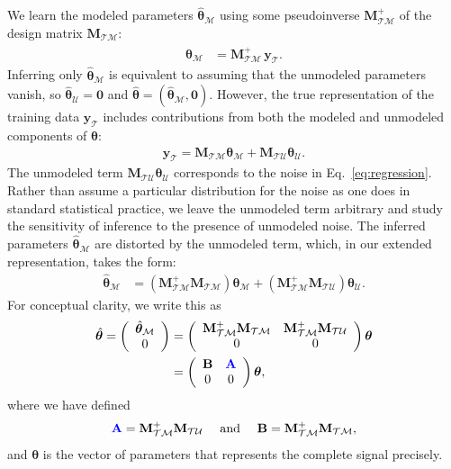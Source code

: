 \documentclass[twocolumn,aps,prx,superscriptaddress,10pt]{revtex4-2}
\newcommand{\by}{\bm{y}}
\newcommand{\0}{\bm{0}}
\newcommand{\btheta}{\boldsymbol{\theta}}
\newcommand{\M}{\mathcal{M}} %
\newcommand{\T}{\mathcal{T}} %
\newcommand{\U}{\mathcal{U}} %
\newcommand{\bbA}{{\color{blue}{\mathbf{A}}}}  %
\newcommand{\bbB}{\mathbf{B}}
\newcommand{\bbM}{\mathbf{M}}
\newcommand{\MTM}{\bbM_{\T\M}}
\newcommand{\MTU}{\bbM_{\T\U}}
\begin{document}
We learn the modeled parameters $\hat{\btheta}_\M$ using some pseudoinverse $\MTM^+$ of the design matrix $\MTM$:
\begin{align}
  \label{eq:thetahat}
  \hat{\btheta}_\M & = \MTM^+ \,\by_\T.
\end{align}
Inferring only $\hat{\btheta}_\M$ is equivalent to assuming that the unmodeled parameters vanish, so $\hat{\btheta}_\U = \0$ and $\hat{\btheta} = (\hat{\btheta}_\M, \0)$. 
However, the true representation of the training data $\by_{\T}$ includes contributions from both the modeled and unmodeled components of $\btheta$:
\begin{align}
\label{eq:regression_nescience}
\by_\T = \MTM \btheta_\M + \MTU \btheta_\U.
\end{align}
The unmodeled term $\MTU \btheta_\U$ corresponds to the noise in Eq.~\eqref{eq:regression}.
Rather than assume a particular distribution for the noise as one does in standard statistical practice, we leave the unmodeled term arbitrary and study the sensitivity of inference to the presence of unmodeled noise.
The inferred parameters $\hat{\btheta}_\M$ are distorted by the unmodeled term, which, in our extended representation, takes the form:
\begin{align}
  \label{eq:thetahatvstrue1}
  \hat{\btheta}_\M & = \left(\MTM^+ \MTM\right) \btheta_\M + \left(\MTM^+ \MTU \right) \btheta_\U.
\end{align}
For conceptual clarity, we write this as 
\begin{align}
  \hat{\btheta} = \left(
            \begin{array}{c}
              \hat{\btheta}_\M \notag\\
              0
            \end{array}
            \right)
            & = \left(
            \begin{array}{cc}
              \MTM^+ \MTM & \MTM^+ \MTU \\
              0 & 0
            \end{array}
            \right)
            \btheta \\
          & = \left(
    \begin{array}{cc}
      \bbB & {\bbA} \\
              0 & 0
            \end{array}
            \right)
    \btheta,
\end{align}
where we have defined
\begin{equation}\label{eq:bbA}
    \bbA  =  \MTM^+ \MTU \quad\text{ and }\quad \bbB = \MTM^+ \MTM,
\end{equation}
and $\btheta$ is the vector of parameters that represents the complete signal precisely.
\end{document}
